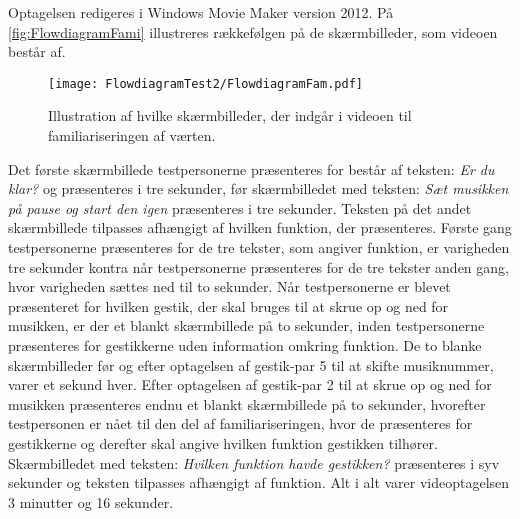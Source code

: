 Optagelsen redigeres i Windows Movie Maker version 2012. På \autoref{fig:FlowdiagramFami} illustreres rækkefølgen på de skærmbilleder, som videoen består af.      
\newpage
%
\begin{figure}[H]
	\centering
	\texttt{[image: FlowdiagramTest2/FlowdiagramFam.pdf]}
	\caption{Illustration af hvilke skærmbilleder, der indgår i videoen til familiariseringen af værten.}
	\label{fig:FlowdiagramFami}
\end{figure}
\noindent
%
Det første skærmbillede testpersonerne præsenteres for består af teksten: \textit{Er du klar?} og præsenteres i tre sekunder, før skærmbilledet med teksten: \textit{Sæt musikken på pause og start den igen} præsenteres i tre sekunder. Teksten på det andet skærmbillede tilpasses afhængigt af hvilken funktion, der præsenteres. Første gang testpersonerne præsenteres for de tre tekster, som angiver funktion, er varigheden tre sekunder kontra når testpersonerne præsenteres for de tre tekster anden gang, hvor varigheden sættes ned til to sekunder. Når testpersonerne er blevet præsenteret for hvilken gestik, der skal bruges til at skrue op og ned for musikken, er der et blankt skærmbillede på to sekunder, inden testpersonerne præsenteres for gestikkerne uden information omkring funktion. De to blanke skærmbilleder før og efter optagelsen af gestik-par 5 til at skifte musiknummer, varer et sekund hver. Efter optagelsen af gestik-par 2 til at skrue op og ned for musikken præsenteres endnu et blankt skærmbillede på to sekunder, hvorefter testpersonen er nået til den del af familiariseringen, hvor de præsenteres for gestikkerne og derefter skal angive hvilken funktion gestikken tilhører. Skærmbilledet med teksten: \textit{Hvilken funktion havde gestikken?} præsenteres i syv sekunder og teksten tilpasses afhængigt af funktion. Alt i alt varer videoptagelsen 3 minutter og 16 sekunder. 